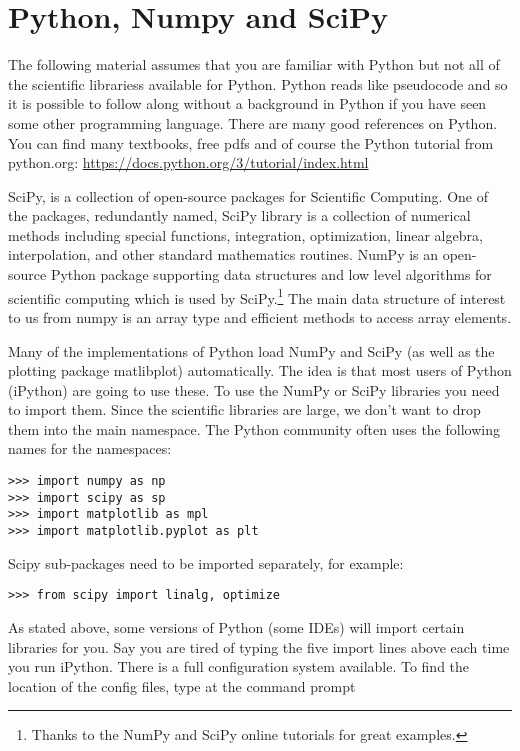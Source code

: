 \hypertarget{python-numpy-and-scipy}{%
\section{Python, Numpy and SciPy}\label{python-numpy-and-scipy}}

The following material assumes that you are familiar with Python but not
all of the scientific librariess available for Python. Python reads like
pseudocode and so it is possible to follow along without a background in
Python if you have seen some other programming language. There are many
good references on Python. You can find many textbooks, free pdfs and of
course the Python tutorial from python.org:
\url{https://docs.python.org/3/tutorial/index.html}

SciPy, is a collection of open-source packages for Scientific Computing.
One of the packages, redundantly named, SciPy library is a collection of
numerical methods including special functions, integration,
optimization, linear algebra, interpolation, and other standard
mathematics routines. NumPy is an open-source Python package supporting
data structures and low level algorithms for scientific computing which
is used by SciPy.\footnote{Thanks to the NumPy and SciPy online
  tutorials for great examples.} The main data structure of interest to
us from numpy is an array type and efficient methods to access array
elements.

Many of the implementations of Python load NumPy and SciPy (as well as
the plotting package matlibplot) automatically. The idea is that most
users of Python (iPython) are going to use these. To use the NumPy or
SciPy libraries you need to import them. Since the scientific libraries
are large, we don't want to drop them into the main namespace. The
Python community often uses the following names for the namespaces:

\begin{verbatim}
>>> import numpy as np
>>> import scipy as sp
>>> import matplotlib as mpl
>>> import matplotlib.pyplot as plt
\end{verbatim}

Scipy sub-packages need to be imported separately, for example:

\begin{verbatim}
>>> from scipy import linalg, optimize
\end{verbatim}

As stated above, some versions of Python (some IDEs) will import certain
libraries for you. Say you are tired of typing the five import lines
above each time you run iPython. There is a full configuration system
available. To find the location of the config files, type at the command
prompt

